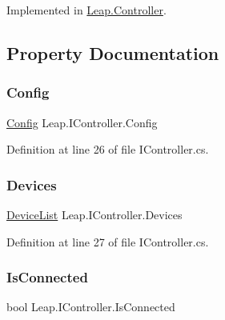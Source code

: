 Implemented in \mbox{\hyperlink{class_leap_1_1_controller_a7e862547a7ea735203220e43c0e04a85}{Leap.\+Controller}}.



\subsection{Property Documentation}
\mbox{\label{interface_leap_1_1_i_controller_a4467b41ebfc169e5727fca824354b0aa}} 
\subsubsection{\texorpdfstring{Config}{Config}}
{\footnotesize\ttfamily \mbox{\hyperlink{class_leap_1_1_config}{Config}} Leap.\+I\+Controller.\+Config\hspace{0.3cm}{\ttfamily [get]}}



Definition at line 26 of file I\+Controller.\+cs.

\mbox{\label{interface_leap_1_1_i_controller_ac7c42db51e1f350f12338d40f1da781f}} 
\subsubsection{\texorpdfstring{Devices}{Devices}}
{\footnotesize\ttfamily \mbox{\hyperlink{class_leap_1_1_device_list}{Device\+List}} Leap.\+I\+Controller.\+Devices\hspace{0.3cm}{\ttfamily [get]}}



Definition at line 27 of file I\+Controller.\+cs.

\mbox{\label{interface_leap_1_1_i_controller_aa91fbd1294e4222aef5ec9080134c572}} 
\subsubsection{\texorpdfstring{IsConnected}{IsConnected}}
{\footnotesize\ttfamily bool Leap.\+I\+Controller.\+Is\+Connected\hspace{0.3cm}{\ttfamily [get]}}



